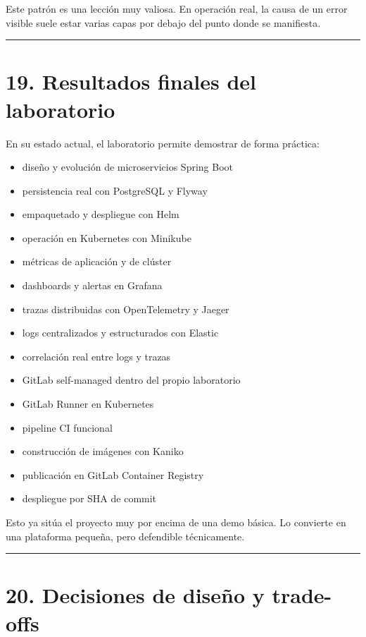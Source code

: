 \documentclass[
a4paper,
12pt]{report}
\providecommand{\tightlist}{%
  \setlength{\itemsep}{0pt}\setlength{\parskip}{0pt}}
\begin{document}
Este patrón es una lección muy valiosa. En operación real, la causa de
un error visible suele estar varias capas por debajo del punto donde se
manifiesta.

\begin{center}\rule{0.5\linewidth}{0.5pt}\end{center}

\chapter{19. Resultados finales del
laboratorio}\label{resultados-finales-del-laboratorio}

En su estado actual, el laboratorio permite demostrar de forma práctica:

\begin{itemize}
\tightlist
\item
  diseño y evolución de microservicios Spring Boot
\item
  persistencia real con PostgreSQL y Flyway
\item
  empaquetado y despliegue con Helm
\item
  operación en Kubernetes con Minikube
\item
  métricas de aplicación y de clúster
\item
  dashboards y alertas en Grafana
\item
  trazas distribuidas con OpenTelemetry y Jaeger
\item
  logs centralizados y estructurados con Elastic
\item
  correlación real entre logs y trazas
\item
  GitLab self-managed dentro del propio laboratorio
\item
  GitLab Runner en Kubernetes
\item
  pipeline CI funcional
\item
  construcción de imágenes con Kaniko
\item
  publicación en GitLab Container Registry
\item
  despliegue por SHA de commit
\end{itemize}

Esto ya sitúa el proyecto muy por encima de una demo básica. Lo
convierte en una plataforma pequeña, pero defendible técnicamente.

\begin{center}\rule{0.5\linewidth}{0.5pt}\end{center}

\chapter{20. Decisiones de diseño y
trade-offs}\label{decisiones-de-diseuxf1o-y-trade-offs}
\end{document}
